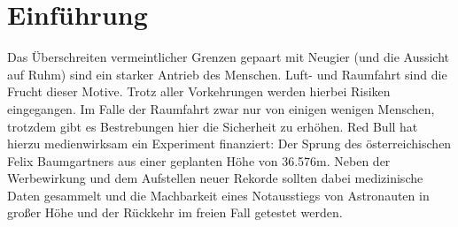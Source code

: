 \newpage

\section{Einführung}

Das Überschreiten vermeintlicher Grenzen gepaart mit Neugier (und die Aussicht auf Ruhm) sind ein starker Antrieb des Menschen.
Luft- und Raumfahrt sind die Frucht dieser Motive.
Trotz aller Vorkehrungen werden hierbei Risiken eingegangen.
Im Falle der Raumfahrt zwar nur von einigen wenigen Menschen, trotzdem gibt es Bestrebungen hier die Sicherheit zu erhöhen.
Red Bull hat hierzu medienwirksam ein Experiment finanziert:
Der Sprung des österreichischen Felix Baumgartners aus einer geplanten Höhe von 36.576m.
Neben der Werbewirkung und dem Aufstellen neuer Rekorde sollten dabei medizinische Daten gesammelt und die Machbarkeit eines Notausstiegs von Astronauten in großer Höhe und der Rückkehr im freien Fall getestet werden.

\newpage
